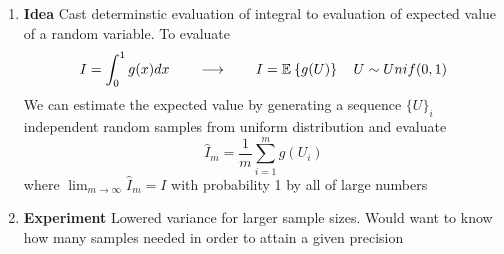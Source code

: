 \documentclass[11pt]{article}
\begin{document}
\begin{enumerate}
    \item \textbf{Idea} Cast determinstic evaluation of integral to evaluation of expected value of a random variable. To evaluate 
    \[
        I = \int_0^1 g(x) dx 
        \qquad 
        \longrightarrow 
        \qquad 
        I = \mathbb{E}_{}\left\{g(U)\right\}
        \quad U\sim Unif(0,1)
    \]
    We can estimate the expected value by generating a sequence $\{U\}_i$ independent random samples from uniform distribution and evaluate 
    \[
        \hat{I}_m = \frac{1}{m} \sum_{i=1}^m g(U_i)
    \]
    where $\lim_{m\to \infty} \hat{I}_m = I$ with probability 1 by all of large numbers
    \item \textbf{Experiment} Lowered variance for larger sample sizes. Would want to know how many samples needed in order to attain a given precision
\end{enumerate}



\end{document}
